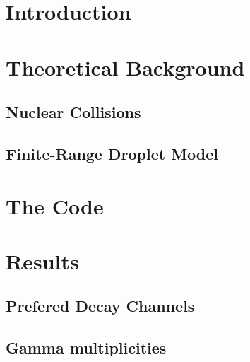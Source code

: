 
\setcounter{page}{1}
\tableofcontents
\clearpage

\pagestyle{scrheadings}
\ofoot[\pagemark]{\pagemark}
\cfoot[]{}

\setlength{\oddsidemargin}{8pt}
\setlength{\evensidemargin}{23pt}

%

\newpage
{}
\setcounter{page}{1}

\chapter{Introduction}
\label{sec:intro}


\chapter{Theoretical Background}
\label{sec:theory}

\section{Nuclear Collisions}
\label{sec:theory:nuc-col}

\section{Finite-Range Droplet Model}
\label{sec:frdm1995}



\chapter{The Code}
\label{sec:code}


\chapter{Results}
\label{sec:results}
\section{Prefered Decay Channels}

\section{Gamma multiplicities}


\printnomenclature

{}


